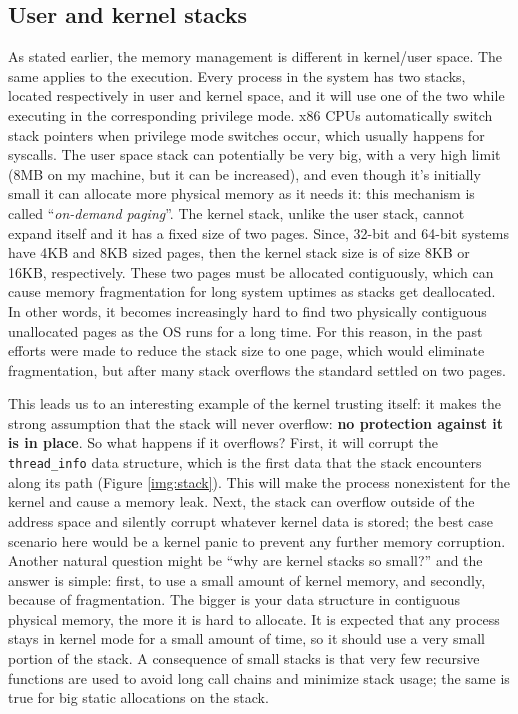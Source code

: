 \subsection{User and kernel stacks}
As stated earlier, the memory management is different in kernel/user space.
The same applies to the execution. Every process in the system has two stacks, located respectively in user and kernel space, and it will use one of the two while executing in the corresponding privilege mode. x86 CPUs automatically switch stack pointers when privilege mode switches occur, which usually happens for syscalls. The user space stack can potentially be very big, with a very high limit (8MB on my machine, but it can be increased), and even though it's initially small it can allocate more physical memory as it needs it: this mechanism is called ``\textit{on-demand paging}''. The kernel stack, unlike the user stack, cannot expand itself and it has a fixed size of two pages. Since, 32-bit and 64-bit systems have 4KB and 8KB sized pages, then the kernel stack size is of size 8KB or 16KB, respectively. These two pages must be allocated contiguously, which can cause memory fragmentation for long system uptimes as stacks get deallocated. In other words, it becomes increasingly hard to find two physically contiguous unallocated pages as the OS runs for a long time. For this reason, in the past efforts were made to reduce the stack size to one page, which would eliminate fragmentation, but after many stack overflows the standard settled on two pages.

This leads us to an interesting example of the kernel trusting itself: it makes the strong assumption that the stack will never overflow: \textbf{no protection against it is in place}. So what happens if it overflows? First, it will corrupt the \verb|thread_info| data structure, which is the first data that the stack encounters along its path (Figure \ref{img:stack}). This will make the process nonexistent for the kernel and cause a memory leak. Next, the stack can overflow outside of the address space and silently corrupt whatever kernel data is stored; the best case scenario here would be a kernel panic to prevent any further memory corruption. Another natural question might be ``why are kernel stacks so small?'' and the answer is simple: first, to use a small amount of kernel memory, and secondly, because of fragmentation. The bigger is your data structure in contiguous physical memory, the more it is hard to allocate. It is expected that any process stays in kernel mode for a small amount of time, so it should use a very small portion of the stack. A consequence of small stacks is that very few recursive functions are used to avoid long call chains and minimize stack usage; the same is true for big static allocations on the stack. %

